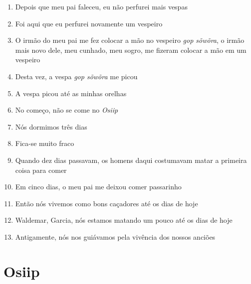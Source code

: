 \begin{enumerate}
 \item Depois que meu pai faleceu, eu não perfurei mais vespas

 \begin{center}\end{center}

 \item Foi aqui que eu perfurei novamente um vespeiro

 \item O irmão do meu pai me fez colocar a mão no vespeiro \textit{gop
 sõwõra}, o irmão mais novo dele, meu cunhado, meu sogro, me fizeram
 colocar a mão em um vespeiro

 \item Desta vez, a vespa \textit{gop sõwõra} me picou

 \item A vespa picou até as minhas orelhas

 \begin{center}\end{center}

 \item No começo, não se come no \textit{Osiip}

 \item Nós dormimos três dias

 \item Fica-se muito fraco

 \item Quando dez dias passavam, os homens daqui costumavam matar a
 primeira coisa para comer

 \item Em cinco dias, o meu pai me deixou comer passarinho

 \begin{center}\end{center}

 \item Então nós vivemos como bons caçadores até os dias de hoje

 \item Waldemar, Garcia, nós estamos matando um pouco até os dias de hoje

 \item Antigamente, nós nos guiávamos pela vivência dos nossos anciões
\end{enumerate}


 \chapter{Osiip}

